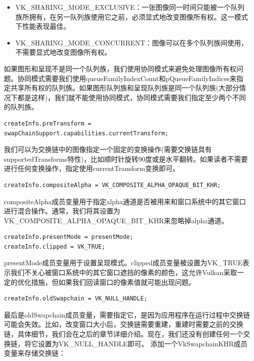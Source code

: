 \documentclass{ctexart}
\begin{document}
\begin{itemize}
	\item VK\_SHARING\_MODE\_EXCLUSIVE：一张图像同一时间只能被一个队列族所拥有，在另一队列族使用它之前，必须显式地改变图像所有权。这一模式下性能表现最佳。
	\item VK\_SHARING\_MODE\_CONCURRENT：图像可以在多个队列族间使用，不需要显式地改变图像所有权。
\end{itemize}

如果图形和呈现不是同一个队列族，我们使用协同模式来避免处理图像所有权问题。协同模式需要我们使用queueFamilyIndexCount和pQueueFamilyIndices来指定共享所有权的队列族。如果图形队列族和呈现队列族是同一个队列族(大部分情况下都是这样)，我们就不能使用协同模式，协同模式需要我们指定至少两个不同的队列族。

\begin{lstlisting}[language={[ANSI]C}]
createInfo.preTransform = swapChainSupport.capabilities.currentTransform;
\end{lstlisting}

我们可以为交换链中的图像指定一个固定的变换操作(需要交换链具有supportedTransforms特性)，比如顺时针旋转90度或是水平翻转。如果读者不需要进行任何变换操作，指定使用currentTransform变换即可。

\begin{lstlisting}[language={[ANSI]C}]
createInfo.compositeAlpha = VK_COMPOSITE_ALPHA_OPAQUE_BIT_KHR;
\end{lstlisting}

compositeAlpha成员变量用于指定alpha通道是否被用来和窗口系统中的其它窗口进行混合操作。通常，我们将其设置为VK\_COMPOSITE\_ALPHA\_OPAQUE\_BIT\_KHR来忽略掉alpha通道。

\begin{lstlisting}[language={[ANSI]C}]
createInfo.presentMode = presentMode;
createInfo.clipped = VK_TRUE;
\end{lstlisting}

presentMode成员变量用于设置呈现模式。clipped成员变量被设置为VK\_TRUE表示我们不关心被窗口系统中的其它窗口遮挡的像素的颜色，这允许Vulkan采取一定的优化措施，但如果我们回读窗口的像素值就可能出现问题。

\begin{lstlisting}[language={[ANSI]C}]
createInfo.oldSwapchain = VK_NULL_HANDLE;
\end{lstlisting}

最后是oldSwapchain成员变量，需要指定它，是因为应用程序在运行过程中交换链可能会失效。比如，改变窗口大小后，交换链需要重建，重建时需要之前的交换链，具体细节，我们会在之后的章节详细介绍。现在，我们还没有创建任何一个交换链，将它设置为VK\_NULL\_HANDLE即可。
添加一个VkSwapchainKHR成员变量来存储交换链：
\end{document}
